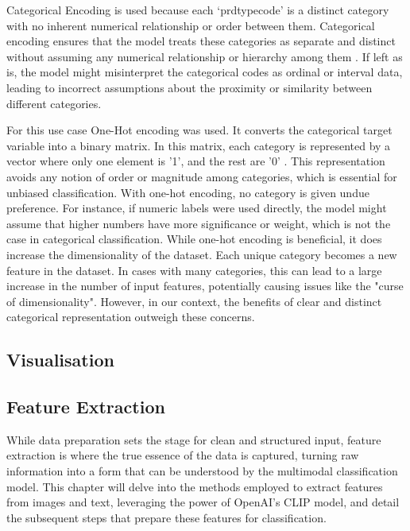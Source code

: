 Categorical Encoding is used because each ‘prdtypecode’ is a distinct category with no inherent numerical relationship or order between them. Categorical encoding ensures that the model treats these categories as separate and distinct without assuming any numerical relationship or hierarchy among them \cite{potdar-2017}. If left as is, the model might misinterpret the categorical codes as ordinal or interval  data, leading to incorrect assumptions about the proximity or similarity between different categories.
  
For this use case One-Hot encoding was used. It converts the categorical target variable into a binary matrix. In this matrix, each category is represented by a vector where only one element is '1', and the rest are '0' \cite{cerda-2018}. This representation avoids any notion of order or magnitude among categories, which is essential for unbiased classification.  
With one-hot encoding, no category is given undue preference. For instance, if numeric labels were used directly, the model might assume that higher numbers have more significance or weight, which is not the case in categorical classification.  
While one-hot encoding is beneficial, it does increase the dimensionality of the dataset. Each unique category becomes a new feature in the dataset. In cases with many categories, this can lead to a large increase in the number of input features, potentially causing issues like the "curse of dimensionality"\cite{altman-2018}. However, in our context, the benefits of clear and distinct categorical representation outweigh these concerns.

\subsection{Visualisation}

\subsection{Feature Extraction}

While data preparation sets the stage for clean and structured input, feature extraction is where the true essence of the data is captured, turning raw information into a form that can be understood by the multimodal classification model. This chapter will delve into the methods employed to extract features from images and text, leveraging the power of OpenAI's CLIP model, and detail the subsequent steps that prepare these features for classification.


